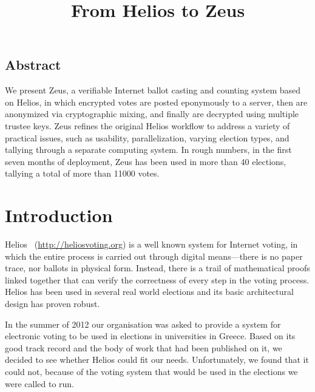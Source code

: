 \documentclass[letterpaper,10pt]{article}
\begin{document}
\date{}

\title{\Large \bf From Helios to Zeus}



\maketitle

\thispagestyle{empty}

\subsection*{Abstract}

We present Zeus, a verifiable Internet ballot casting and counting
system based on Helios, in which encrypted votes are posted eponymously
to a server, then are anonymized via cryptographic mixing, and
finally are decrypted using multiple trustee keys. Zeus refines the
original Helios workflow to address a variety of practical issues, such
as usability, parallelization, varying election types, and tallying
through a separate computing system.
In rough numbers, in the first seven months of deployment, Zeus has been
used in more than 40 elections, tallying a total of more than 11000 votes.

\section{Introduction}

Helios~\cite{adida:2008} (\url{http://heliosvoting.org}) is a well
known system for Internet voting, in which the entire process is
carried out through digital means---there is no paper trace, nor
ballots in physical form. Instead, there is a trail of mathematical
proofs linked together that can verify the correctness of every step
in the voting process. Helios has been used in several real world
elections and its basic architectural design has proven robust.

In the summer of 2012 our organisation was asked to provide a system
for electronic voting to be used in elections in universities in
Greece. Based on its good track record and the body of work that had
been published on it, we decided to see whether Helios could fit our
needs. Unfortunately, we found that it could not, because of the
voting system that would be used in the elections we were called to
run.
\end{document}
